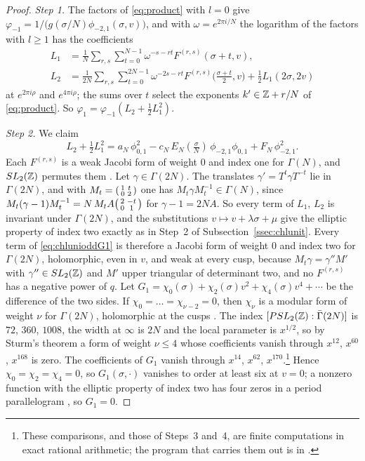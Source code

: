 \begin{proof}
\emph{Step 1.} The factors of \eqref{eq:product} with $l=0$ give $\varphi_{-1}=1/\big(g(\sigma/N)\phi_{-2,1}(\sigma,v)\big)$, and with $\omega=e^{2\pi i/N}$ the logarithm of the factors with $l\ge1$ has the coefficients
\[
\begin{aligned}
L_1&=\frac1N\sum_{r,s}\sum_{t=0}^{N-1}\omega^{-s-rt}F^{(r,s)}(\sigma+t,v),\\
L_2&=\frac1{2N}\sum_{r,s}\sum_{t=0}^{2N-1}\omega^{-2s-rt}F^{(r,s)}\big(\tfrac{\sigma+t}2,v\big)+\tfrac12L_1(2\sigma,2v)
\end{aligned}
\]
at $e^{2\pi i\rho}$ and $e^{4\pi i\rho}$; the sums over $t$ select the exponents $k'\in\mathbb{Z}+r/N$ of \eqref{eq:product}. So $\varphi_1=\varphi_{-1}(L_2+\tfrac12L_1^2)$.

\emph{Step 2.} We claim
\begin{equation}\label{eq:chlunioddG1}
L_2+\tfrac12L_1^2=a_N\,\phi_{0,1}^2-c_N\,E_N(\tfrac\sigma N)\,\phi_{-2,1}\phi_{0,1}+F_N\,\phi_{-2,1}^2 .
\end{equation}
Each $F^{(r,s)}$ is a weak Jacobi form of weight $0$ and index one for $\Gamma(N)$, and $SL_2(\mathbb{Z})$ permutes them \cite{DJS06}. Let $\gamma\in\Gamma(2N)$. The translates $\gamma'=T^t\gamma T^{-t}$ lie in $\Gamma(2N)$, and with $M_t=\begin{psmallmatrix}1&t\\0&2\end{psmallmatrix}$ one has $M_t\gamma M_t^{-1}\in\Gamma(N)$, since $M_t(\gamma-1)M_t^{-1}=N\,M_tA\begin{psmallmatrix}2&-t\\0&1\end{psmallmatrix}$ for $\gamma-1=2NA$. So every term of $L_1$, $L_2$ is invariant under $\Gamma(2N)$, and the substitutions $v\mapsto v+\lambda\sigma+\mu$ give the elliptic property of index two exactly as in Step~2 of Subsection~\ref{ssec:chlunit}. Every term of \eqref{eq:chlunioddG1} is therefore a Jacobi form of weight $0$ and index two for $\Gamma(2N)$, holomorphic, even in $v$, and weak at every cusp, because $M_t\gamma=\gamma''M'$ with $\gamma''\in SL_2(\mathbb{Z})$ and $M'$ upper triangular of determinant two, and no $F^{(r,s)}$ has a negative power of $q$. Let $G_1=\chi_0(\sigma)+\chi_2(\sigma)v^2+\chi_4(\sigma)v^4+\cdots$ be the difference of the two sides. If $\chi_0=\dots=\chi_{\nu-2}=0$, then $\chi_\nu$ is a modular form of weight $\nu$ for $\Gamma(2N)$, holomorphic at the cusps \cite[\S3]{EZ85}. The index $[PSL_2(\mathbb{Z}):\bar\Gamma(2N)]$ is $72$, $360$, $1008$, the width at $\infty$ is $2N$ and the local parameter is $x^{1/2}$, so by Sturm's theorem \cite{Sturm87} a form of weight $\nu\le4$ whose coefficients vanish through $x^{12}$, $x^{60}$, $x^{168}$ is zero. The coefficients of $G_1$ vanish through $x^{14}$, $x^{62}$, $x^{170}$.\footnote{These comparisons, and those of Steps~3 and~4, are finite computations in exact rational arithmetic; the program that carries them out is in \cite{Bha26}.} Hence $\chi_0=\chi_2=\chi_4=0$, so $G_1(\sigma,\cdot)$ vanishes to order at least six at $v=0$; a nonzero function with the elliptic property of index two has four zeros in a period parallelogram \cite[Theorem~1.2]{EZ85}, so $G_1=0$.


\end{proof}
